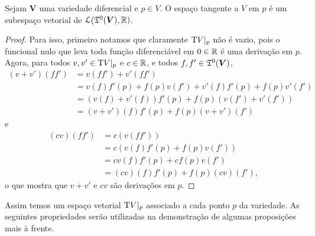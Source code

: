 \begin{proposition}
Sejam $\bm V$ uma variedade diferencial e $p \in V$. O espaço tangente a $V$ em $p$ é um subespaço vetorial de $\mathcal{L}(\mathfrak{T}^0(\bm V),\mathbb{R})$.
\end{proposition}
\begin{proof}
Para isso, primeiro notamos que claramente $\mathrm{T} V|_p$ não é vazio, pois o funcional nulo que leva toda função diferenciável em $0 \in \mathbb{R}$ é uma derivação em $p$.
%
Agora, para todos $v,v' \in \mathrm{T} V|_p$ e $c \in \mathbb{R}$, e todos $f,f' \in \mathfrak{T}^0(\bm V)$,
	\begin{align*}
	(v+v')(ff') &= v(ff') + v'(ff') \\
		&= v(f)f'(p) + f(p)v(f') + v'(f)f'(p) + f(p)v'(f') \\
		&= (v(f) + v'(f))f'(p) + f(p)(v(f') + v'(f')) \\
		&= (v+v')(f)f'(p) + f(p)(v+v')(f')
	\end{align*}
e
	\begin{align*}
	(cv)(ff') &= c(v(ff')) \\
		&= c(v(f)f'(p) + f(p)v(f')) \\
		&= cv(f)f'(p) + cf(p)v(f') \\
		&= (cv)(f)f'(p) + f(p)(cv)(f'),
	\end{align*}
o que mostra que $v+v'$ e $cv$ são derivações em $p$.
\end{proof}

Assim temos um espaço vetorial $\mathrm{T} V|_p$ associado a cada ponto $p$ da variedade. As seguintes propriedades serão utilizadas na demonstração de algumas proposições mais à frente.

